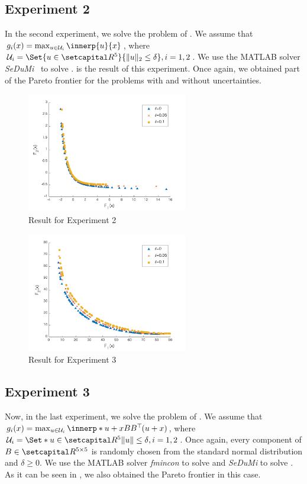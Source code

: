 \documentclass[../main]{subfiles}
\begin{document}
\subsection*{Experiment 2}
In the second experiment, we solve the problem of . We assume that $g_i(x) = \max_{u \in \mathcal{U}_i } \innerp{u}{x}$, where $\mathcal{U}_i = \Set{u \in \setR^5 }{ \norm{u}_2 \leq \delta }, i = 1, 2$. We use the MATLAB solver \emph{SeDuMi}~\cite{Sturm1999} to solve .
 is the result of this experiment. 
Once again, we obtained part of the Pareto frontier for the problems with and without uncertainties.
\begin{figure}[htbp]
\centering
\includegraphics[clip, width = 7.0cm]{figs/linear_ellipsoid_without_line_search}
\caption{Result for Experiment 2}
\end{figure}
\begin{figure}[thbp]
\centering
\includegraphics[clip, width = 7.0cm]{figs/quadratic_ellipsoid_without_line_search}
\caption{Result for Experiment 3}
\end{figure}
\subsection*{Experiment 3}
Now, in the last experiment, we solve the problem of . 
We assume that $g_i(x) = \max_{u \in \mathcal{U}_i } \innerp*{u + x}{B B^\T (u + x)}$, where $\mathcal{U}_i = \Set*{u \in \setR^5}{\norm{u} \leq \delta}, i = 1, 2$. 
Once again, every component of $B \in \setR^{5 \times 5}$ is randomly chosen from the standard normal distribution and $\delta \geq 0$. We use the MATLAB solver \emph{fmincon} to solve  and \emph{SeDuMi} to solve . As it can be seen in , we also obtained the Pareto frontier in this case.
\end{document}
